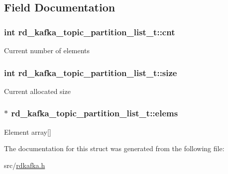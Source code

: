 \subsection{Field Documentation}
\hypertarget{structrd__kafka__topic__partition__list__t_a3b9ea691a2ecea3774a7e994c8c0c805}{
\subsubsection[{cnt}]{\setlength{\rightskip}{0pt plus 5cm}int {\bf rd\_\-kafka\_\-topic\_\-partition\_\-list\_\-t::cnt}}}
\label{structrd__kafka__topic__partition__list__t_a3b9ea691a2ecea3774a7e994c8c0c805}
Current number of elements \hypertarget{structrd__kafka__topic__partition__list__t_a476e475526035de7b10cd79991771d57}{
\subsubsection[{size}]{\setlength{\rightskip}{0pt plus 5cm}int {\bf rd\_\-kafka\_\-topic\_\-partition\_\-list\_\-t::size}}}
\label{structrd__kafka__topic__partition__list__t_a476e475526035de7b10cd79991771d57}
Current allocated size \hypertarget{structrd__kafka__topic__partition__list__t_acf0fc06547578cd074423565440b58da}{
\subsubsection[{elems}]{$\ast$ {\bf rd\_\-kafka\_\-topic\_\-partition\_\-list\_\-t::elems}}}
\label{structrd__kafka__topic__partition__list__t_acf0fc06547578cd074423565440b58da}
Element array\mbox{[}\mbox{]} 

The documentation for this struct was generated from the following file:\begin{DoxyCompactItemize}
\item 
src/\hyperlink{rdkafka_8h}{rdkafka.h}\end{DoxyCompactItemize}
